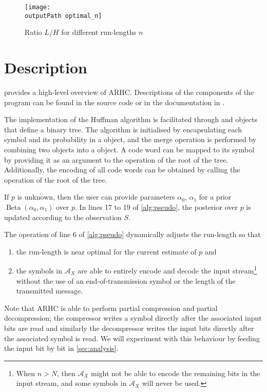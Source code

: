 \documentclass[letterpaper,11pt]{extarticle}
\newcommand{\outputPath}{output/}
\begin{document}
\begin{figure}[ht]
    \centering
    \texttt{[image: \\outputPath optimal\_n]}
    \caption{Ratio $L/H$ for different run-lengths $n$}
    \label{fig:ratio}
\end{figure}


\section{Description}
 provides a high-level overview of ARHC. Descriptions of the components of the program can be found in the source code or in the documentation in .

The implementation of the Huffman algorithm is facilitated through  and  objects that define a binary tree. The algorithm is initialised by encapsulating each symbol and its probability in a  object, and the merge operation is performed by combining two  objects into a  object. A code word can be mapped to its symbol by providing it as an argument to the  operation of the root  of the tree. Additionally, the encoding of all code words can be obtained by calling the  operation of the root  of the tree.

If $p$ is unknown, then the user can provide parameters $\alpha_0$, $\alpha_1$ for a prior $\operatorname{Beta}(\alpha_0, \alpha_1)$ over $p$. In lines 17 to 19 of \cref{alg:pseudo}, the posterior over $p$ is updated according to the observation $S$.

The operation of line 6 of \cref{alg:pseudo} dynamically adjusts the run-length so that
\begin{enumerate}
    \item the run-length is near optimal for the current estimate of $p$ and
    \item the symbols in $\mathcal{A}_X$ are able to entirely encode and decode the input stream\footnote{When $n>N$, then $\mathcal{A}_X$ might not be able to encode the remaining bits in the input stream, and some symbols in $\mathcal{A}_X$ will never be used.} without the use of an end-of-transmission symbol or the length of the transmitted message.
\end{enumerate}

Note that ARHC is able to perform partial compression and partial decompression; the compressor writes a symbol directly after the associated input bits are read and similarly the decompressor writes the input bits directly after the associated symbol is read. We will experiment with this behaviour by feeding the input bit by bit in \cref{sec:analysis}.
\end{document}
